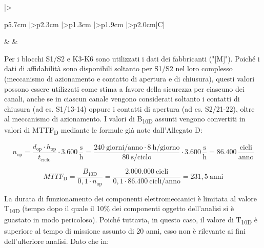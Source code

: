 \begin{center}
\begin{minipage}{\textwidth}
    \vspace{2pt}
    \begin{tabularx}{\textwidth}{%
        |>{\raggedright\arraybackslash}p{5.7cm}%
        |>{\centering\arraybackslash}p{2.3cm}%
        |>{\centering\arraybackslash}p{1.3cm}%
        |>{\centering\arraybackslash}p{1.9cm}%
        |>{\centering\arraybackslash}p{2.0cm}|C|}
        \hline
         &
         &
        \frecciadx\enspace{} \\
        \hline
    \end{tabularx}
    \end{minipage}
\end{center}

Per i blocchi S1/S2 e K3-K6 sono utilizzati i dati dei fabbricanti ("[M]"). Poiché i dati di affidabilità sono disponibili soltanto per S1/S2 nel loro complesso (meccanismo di azionamento e contatto di apertura e di chiusura), questi valori possono essere utilizzati come stima a favore della sicurezza per ciascuno dei canali, anche se in ciascun canale vengono considerati soltanto i contatti di chiusura (ad es. S1/13-14) oppure i contatti di apertura (ad es. S2/21-22), oltre al meccanismo di azionamento. I valori di B\textsubscript{10D} assunti vengono convertiti in valori di MTTF\textsubscript{D} mediante le formule già note dall'Allegato D:

\begin{equation}
    n_{\mathrm{op}}
    = \frac{d_{\mathrm{op}} \cdot h_{\mathrm{op}}}{t_{\mathrm{ciclo}}} \cdot 3{.}600\,\frac{\mathrm{s}}{\mathrm{h}}
    = \frac{240\ \text{giorni/anno} \cdot 8\ \text{h/giorno}}{80\ \text{s/ciclo}} \cdot 3{.}600\,\frac{\mathrm{s}}{\mathrm{h}}
    = 86{.}400\,\frac{\text{cicli}}{\text{anno}}
    \label{eq:06-06}
\end{equation}

\begin{equation}
    \textit{MTTF}_{\mathrm{D}}
    = \frac{B_{\mathrm{10D}}}{0{,}1 \cdot n_{\mathrm{op}}}
    = \frac{2{.}000{.}000\ \text{cicli}}{0{,}1 \cdot 86{.}400\ \text{cicli/anno}}
    = 231{,}5\ \text{anni}
    \label{eq:06-07}
\end{equation}

La durata di funzionamento dei componenti elettromeccanici è limitata al valore T\textsubscript{10D} (tempo dopo il quale il 10\% dei componenti oggetto dell'analisi si è guastato in modo pericoloso). Poiché tuttavia, in questo caso, il valore di T\textsubscript{10D} è superiore al tempo di missione assunto di 20 anni, esso non è rilevante ai fini dell'ulteriore analisi. Dato che in:

